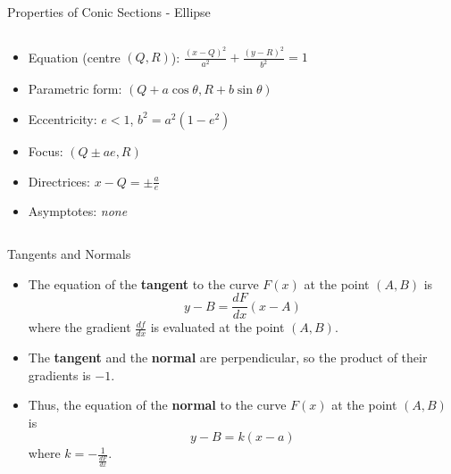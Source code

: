 \documentclass[10pt]{beamer}
\begin{document}
\begin{frame}{Properties of Conic Sections - Ellipse}
{\begin{columns}
        \begin{column}{0.5\textwidth}
          \begin{itemize}[<+->]
            \item Equation (centre $(Q,R)$): $\frac{(x-Q)^2}{a^2} + \frac{(y-R)^2}{b^2} = 1$
            \item Parametric form: $(Q + a\cos\theta,R + b\sin\theta)$
            \item Eccentricity: $e < 1$, $b^2 = a^2(1-e^2)$
            \item Focus: $(Q \pm ae,R)$
            \item Directrices: $x-Q = \pm\frac{a}{e}$
            \item Asymptotes: \textit{none}
          \end{itemize}
        \end{column}
      \end{columns}
    }
\end{frame}

\begin{frame}{Tangents and Normals}
  \begin{itemize}[<+->]
    \item The equation of the \textbf{tangent} to the curve $F(x)$ at the point $(A,B)$ is
    \begin{equation}
        y-B = \frac{dF}{dx}(x-A)
    \end{equation}
    where the gradient $\frac{df}{dx}$ is evaluated at the point $(A,B)$.
    \item The \textbf{tangent} and the \textbf{normal} are perpendicular, so the product of their gradients is $-1$.
    \item Thus, the equation of the \textbf{normal} to the curve $F(x)$ at the point $(A,B)$ is
    \begin{equation}
        y-B = k(x-a)
    \end{equation}
    where $k = -\frac{1}{\frac{dF}{dx}}$.
  \end{itemize}
\end{frame}
\end{document}

